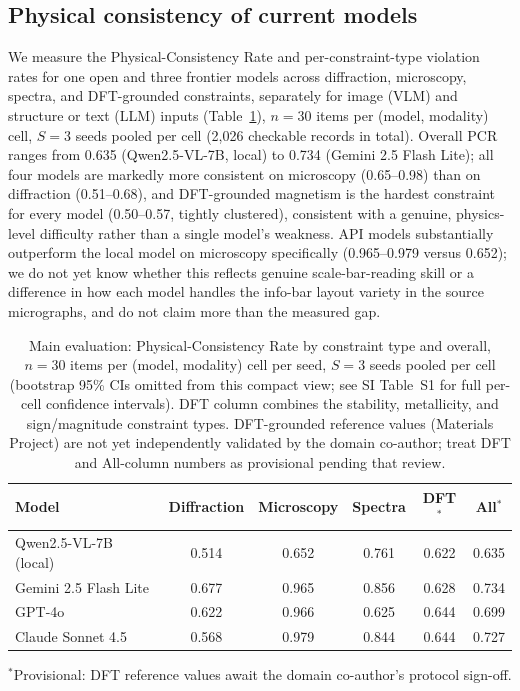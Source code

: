 \documentclass[pdflatex,sn-nature]{sn-jnl}
\begin{document}
\subsection*{Physical consistency of current models}
We measure the Physical-Consistency Rate and per-constraint-type violation rates for
one open and three frontier models across diffraction, microscopy, spectra, and
DFT-grounded constraints, separately for image (VLM) and structure or text (LLM)
inputs (Table~\ref{tab:main}), $n=30$ items per (model, modality) cell, $S=3$ seeds
pooled per cell (2{,}026 checkable records in total). Overall PCR ranges from 0.635
(Qwen2.5-VL-7B, local) to 0.734 (Gemini 2.5 Flash Lite); all four models are
markedly more consistent on microscopy (0.65--0.98) than on diffraction (0.51--0.68),
and DFT-grounded magnetism is the hardest constraint for every model (0.50--0.57,
tightly clustered), consistent with a genuine, physics-level difficulty rather than a
single model's weakness. API models substantially outperform the local model on
microscopy specifically (0.965--0.979 versus 0.652); we do not yet know whether this
reflects genuine scale-bar-reading skill or a difference in how each model handles the
info-bar layout variety in the source micrographs, and do not claim more than the
measured gap.

\begin{table}[t]
\centering
\caption{Main evaluation: Physical-Consistency Rate by constraint type and overall,
$n=30$ items per (model, modality) cell per seed, $S=3$ seeds pooled per cell
(bootstrap 95\% CIs omitted from this compact view; see SI Table~S1 for full
per-cell confidence intervals). DFT column combines the stability, metallicity,
and sign/magnitude constraint types. DFT-grounded reference values (Materials
Project) are not yet independently validated by the domain co-author; treat DFT
and All-column numbers as provisional pending that review.}
\label{tab:main}
{\scriptsize\setlength{\tabcolsep}{4pt}
\begin{tabular}{lccccc}
\toprule
Model & Diffraction & Microscopy & Spectra & DFT$^{*}$ & All$^{*}$ \\
\midrule
Qwen2.5-VL-7B (local)  & 0.514 & 0.652 & 0.761 & 0.622 & 0.635 \\
Gemini 2.5 Flash Lite  & 0.677 & 0.965 & 0.856 & 0.628 & 0.734 \\
GPT-4o                 & 0.622 & 0.966 & 0.625 & 0.644 & 0.699 \\
Claude Sonnet 4.5      & 0.568 & 0.979 & 0.844 & 0.644 & 0.727 \\
\bottomrule
\end{tabular}}
\end{table}
{\scriptsize $^{*}$Provisional: DFT reference values await the domain co-author's protocol sign-off.}
\end{document}
